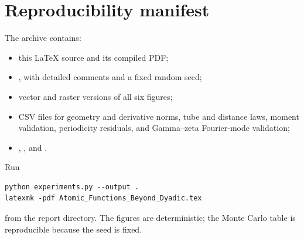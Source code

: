 \documentclass[11pt,oneside]{article}
\theoremstyle{definition}
\theoremstyle{remark}
\begin{document}
\section{Reproducibility manifest}
\label{app:reproducibility}

The archive contains:
\begin{itemize}
\item this LaTeX source and its compiled PDF;
\item {}, with detailed comments and a fixed random seed;
\item vector and raster versions of all six figures;
\item CSV files for geometry and derivative norms, tube and distance laws, moment validation,
      periodicity residuals, and Gamma--zeta Fourier-mode validation;
\item {}, , and .
\end{itemize}
Run
\begin{lstlisting}[style=pseudo]
python experiments.py --output .
latexmk -pdf Atomic_Functions_Beyond_Dyadic.tex
\end{lstlisting}
from the report directory.  The figures are deterministic; the Monte Carlo table is
reproducible because the seed is fixed.
\end{document}
